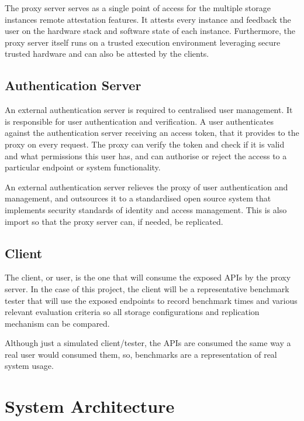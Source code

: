 The proxy server serves as a single point of access for the multiple storage instances remote attestation features. It attests every instance and feedback the user on the hardware stack and software state of each instance. Furthermore, the proxy server itself runs on a trusted execution environment leveraging secure trusted hardware and can also be attested by the clients.

\subsection{Authentication Server}
\label{ssec:authentication_server}

An external authentication server is required to centralised user management. It is responsible for user authentication and verification. A user authenticates against the authentication server receiving an access token, that it provides to the proxy on every request. The proxy can verify the token and check if it is valid and what permissions this user has, and can authorise or reject the access to a particular endpoint or system functionality.

An external authentication server relieves the proxy of user authentication and management, and outsources it to a standardised open source system that implements security standards of identity and access management. This is also import so that the proxy server can, if needed, be replicated.

\subsection{Client}
\label{ssec:client}

The client, or user, is the one that will consume the exposed \glspl{API} by the proxy server. In the case of this project, the client will be a representative benchmark tester that will use the exposed endpoints to record benchmark times and various relevant evaluation criteria so all storage configurations and replication mechanism can be compared.

Although just a simulated client/tester, the \glspl{API} are consumed the same way a real user would consumed them, so, benchmarks are a representation of real system usage.

\section{System Architecture}
\label{sec:system_architecture}

